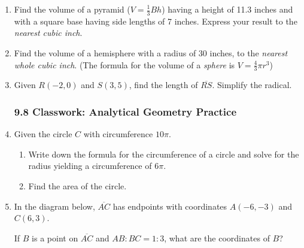 \documentclass[12pt, twoside]{article}
\begin{document}
\begin{enumerate}
\newpage

\item Find the volume of a pyramid ($V=\frac{1}{3}Bh$) having a height of 11.3 inches and with a square base having side lengths of 7 inches. Express your result to the \emph{nearest cubic inch}. \vspace{5cm}

\item Find the volume of a hemisphere with a radius of 30 inches, to the \emph{nearest whole cubic inch}. (The formula for the volume of a \emph{sphere} is $V=\frac{4}{3}\pi r^3$)  \vspace{5cm}

\item Given $R(-2,0)$ and $S(3,5)$, find the length of $\overline{RS}$. Simplify the radical.

\newpage
\subsubsection*{9.8 Classwork: Analytical Geometry Practice}
\item Given the circle $C$ with circumference $10\pi$.
   \begin{enumerate}
     \item Write down the formula for the circumference of a circle and solve for the radius yielding a circumference of $6\pi$. \vspace{1cm}
     \item Find the area of the circle.
   \end{enumerate}

\newpage
\item In the diagram below, $\overline{AC}$ has endpoints with coordinates $A(-6,-3)$ and $C(6, 3)$.
  \begin{center} %
  \end{center}
  If $B$ is a point on $\overline{AC}$ and $AB {:} BC = 1{:}3$,  what  are  the coordinates of $B$? \vspace{5cm}


\end{enumerate}
\end{document}
